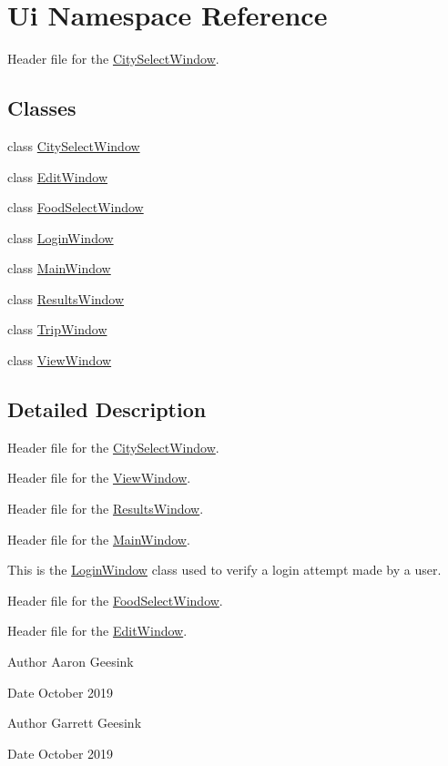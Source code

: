 \hypertarget{namespace_ui}{}\section{Ui Namespace Reference}
\label{namespace_ui}


Header file for the \mbox{\hyperlink{class_ui_1_1_city_select_window}{City\+Select\+Window}}.  


\subsection*{Classes}
\begin{DoxyCompactItemize}
\item 
class \mbox{\hyperlink{class_ui_1_1_city_select_window}{City\+Select\+Window}}
\item 
class \mbox{\hyperlink{class_ui_1_1_edit_window}{Edit\+Window}}
\item 
class \mbox{\hyperlink{class_ui_1_1_food_select_window}{Food\+Select\+Window}}
\item 
class \mbox{\hyperlink{class_ui_1_1_login_window}{Login\+Window}}
\item 
class \mbox{\hyperlink{class_ui_1_1_main_window}{Main\+Window}}
\item 
class \mbox{\hyperlink{class_ui_1_1_results_window}{Results\+Window}}
\item 
class \mbox{\hyperlink{class_ui_1_1_trip_window}{Trip\+Window}}
\item 
class \mbox{\hyperlink{class_ui_1_1_view_window}{View\+Window}}
\end{DoxyCompactItemize}


\subsection{Detailed Description}
Header file for the \mbox{\hyperlink{class_ui_1_1_city_select_window}{City\+Select\+Window}}. 

Header file for the \mbox{\hyperlink{class_ui_1_1_view_window}{View\+Window}}.

Header file for the \mbox{\hyperlink{class_ui_1_1_results_window}{Results\+Window}}.

Header file for the \mbox{\hyperlink{class_ui_1_1_main_window}{Main\+Window}}.

This is the \mbox{\hyperlink{class_ui_1_1_login_window}{Login\+Window}} class used to verify a login attempt made by a user.

Header file for the \mbox{\hyperlink{class_ui_1_1_food_select_window}{Food\+Select\+Window}}.

Header file for the \mbox{\hyperlink{class_ui_1_1_edit_window}{Edit\+Window}}.

\begin{DoxyAuthor}{Author}
Aaron Geesink 
\end{DoxyAuthor}
\begin{DoxyDate}{Date}
October 2019
\end{DoxyDate}
\begin{DoxyAuthor}{Author}
Garrett Geesink 
\end{DoxyAuthor}
\begin{DoxyDate}{Date}
October 2019 
\end{DoxyDate}
